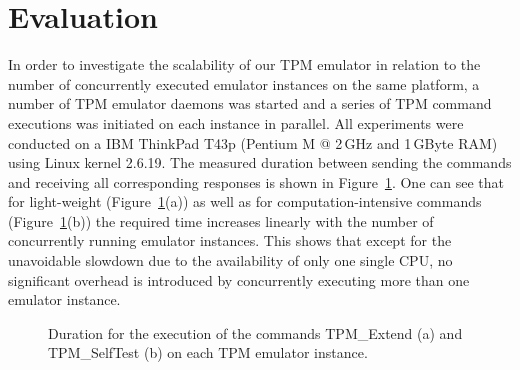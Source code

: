 \documentclass[runningheads]{llncs}
\begin{document}
\section{Evaluation}
In order to investigate the scalability of our TPM emulator in relation to the number of
concurrently executed emulator instances on the same platform, a number of TPM emulator daemons was
started and a series of TPM command executions was initiated on each instance in parallel. All
experiments were conducted on a IBM ThinkPad T43p (Pentium M @ 2\,GHz and 1\,GByte RAM) using Linux
kernel 2.6.19. The measured duration between sending the commands and receiving all corresponding
responses is shown in Figure~\ref{plot:execution_time}. One can see that for light-weight
(Figure~\ref{plot:execution_time}(a)) as well as for computation-intensive commands
(Figure~\ref{plot:execution_time}(b)) the required time increases linearly with the number of
concurrently running emulator instances. This shows that except for the unavoidable slowdown due
to the availability of only one single CPU, no significant overhead is introduced by concurrently
executing more than one emulator instance.

\begin{figure}[h]
\centering
{}\quad%
\vspace*{-3mm}
\caption{Duration for the execution of the commands TPM\_Extend (a) and TPM\_SelfTest (b) on each
TPM emulator instance.}
\label{plot:execution_time}
\end{figure}
\end{document}
